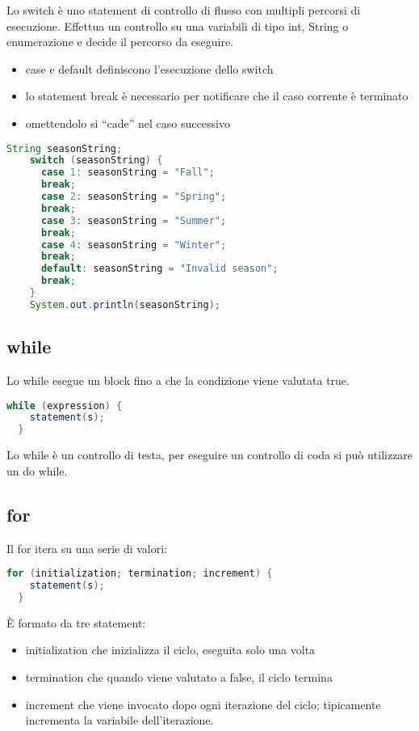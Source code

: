 \documentclass[a4paper,12pt,twoside]{book}
\begin{document}
Lo switch è uno statement di controllo di flusso con multipli percorsi di
esecuzione. Effettua un controllo su una variabili di tipo int, String
o enumerazione e decide il percorso da eseguire.
\begin{itemize}
\item case e default
  definiscono
  l’esecuzione dello
  switch
\item lo statement break è
  necessario per
  notificare che il caso
  corrente è terminato
\item omettendolo si “cade”
  nel caso successivo
\end{itemize}
\footnotesize{
  \begin{lstlisting}[caption={switch},
    label={lst:switch},language=Java]
    String seasonString;
    switch (seasonString) {
      case 1: seasonString = "Fall";
      break;
      case 2: seasonString = "Spring";
      break;
      case 3: seasonString = "Summer";
      break;
      case 4: seasonString = "Winter";
      break;
      default: seasonString = "Invalid season";
      break;
    }
    System.out.println(seasonString);
  \end{lstlisting}}

\subsection{while}

Lo while esegue un block fino a che la condizione viene valutata true.
\begin{lstlisting}[caption={while},
  label={lst:while},language=Java]
  while (expression) { 
    statement(s); 
  }
\end{lstlisting}

Lo while è un controllo di testa, per eseguire un controllo di coda si
può utilizzare un do while.

\subsection{for}

Il for itera su una serie di valori:
\begin{lstlisting}[caption={for},
  label={lst:for},language=Java]
  for (initialization; termination; increment) {
    statement(s);
  }
\end{lstlisting}

È formato da tre statement:
\begin{itemize}
\item initialization che inizializza il ciclo, eseguita solo una volta
\item termination che quando viene valutato a false, il ciclo termina
\item increment che viene invocato dopo ogni iterazione del
  ciclo; tipicamente incrementa la variabile dell'iterazione. 
\end{itemize}
\end{document}
